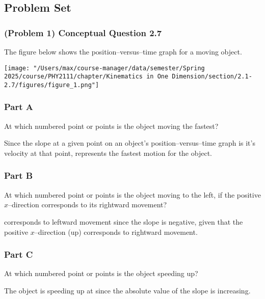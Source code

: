 
\subsection{Problem Set}

\subsubsection{(Problem 1) Conceptual Question 2.7}

The figure below shows the position--versus--time graph for a moving object.

\begin{center}
	\texttt{[image: "/Users/max/course-manager/data/semester/Spring 2025/course/PHY2111/chapter/Kinematics in One Dimension/section/2.1-2.7/figures/figure\_1.png"]}
\end{center}

\subsubsection{Part A}
At which numbered point or points is the object moving the fastest?

\begin{solution}
	Since the slope at a given point on an object's position--versus--time graph is it's velocity at that point,  represents the fastest motion for the object.
\end{solution}

\subsubsection{Part B}
At which numbered point or points is the object moving to the left, if the positive $x$--direction corresponds to its rightward movement?

\begin{solution}
	 corresponds to leftward movement since the slope is negative, given that the positive $x$--direction (up) corresponds to rightward movement.
\end{solution}

\subsubsection{Part C}
At which numbered point or points is the object speeding up?

\begin{solution}
	The object is speeding up at  since the absolute value of the slope is increasing.
\end{solution}

